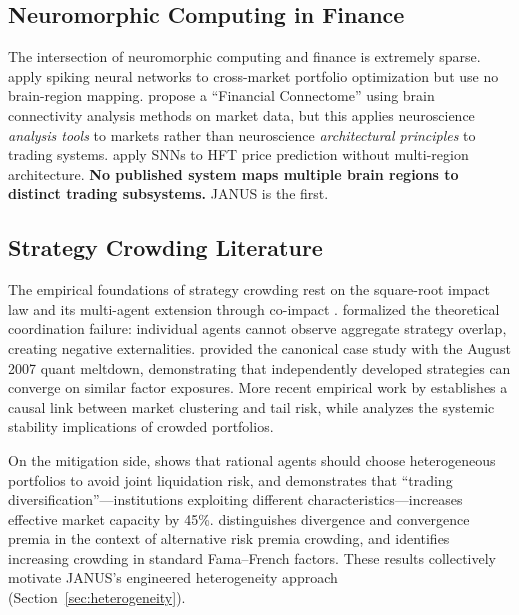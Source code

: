 \documentclass[12pt, a4paper]{article}
\begin{document}
\subsection{Neuromorphic Computing in Finance}
\label{sec:rw_neuromorphic_finance}

The intersection of neuromorphic computing and finance is extremely sparse. \citet{mohan2025snn_portfolio} apply spiking neural networks to cross-market portfolio optimization but use no brain-region mapping. \citet{bi2025financial_connectome} propose a ``Financial Connectome'' using brain connectivity analysis methods on market data, but this applies neuroscience \textit{analysis tools} to markets rather than neuroscience \textit{architectural principles} to trading systems. \citet{ezinwoke2025snn_hft} apply SNNs to HFT price prediction without multi-region architecture. \textbf{No published system maps multiple brain regions to distinct trading subsystems.} JANUS is the first.

\subsection{Strategy Crowding Literature}
\label{sec:rw_crowding}

The empirical foundations of strategy crowding rest on the square-root impact law \citep{toth2011anomalous, bouchaud2018trades, bucci2019crossover} and its multi-agent extension through co-impact \citep{bucci2020coimpact}. \citet{stein2009crowding} formalized the theoretical coordination failure: individual agents cannot observe aggregate strategy overlap, creating negative externalities. \citet{khandani2011quants} provided the canonical case study with the August 2007 quant meltdown, demonstrating that independently developed strategies can converge on similar factor exposures. More recent empirical work by \citet{vankralingen2021crowded} establishes a causal link between market clustering and tail risk, while \citet{caccioli2014stability} analyzes the systemic stability implications of crowded portfolios.

On the mitigation side, \citet{wagner2011diversity} shows that rational agents should choose heterogeneous portfolios to avoid joint liquidation risk, and \citet{demiguel2021crowding} demonstrates that ``trading diversification''---institutions exploiting different characteristics---increases effective market capacity by 45\%. \citet{baltas2019arp} distinguishes divergence and convergence premia in the context of alternative risk premia crowding, and \citet{volpati2020zooming} identifies increasing crowding in standard Fama--French factors. These results collectively motivate JANUS's engineered heterogeneity approach (Section~\ref{sec:heterogeneity}).
\end{document}

